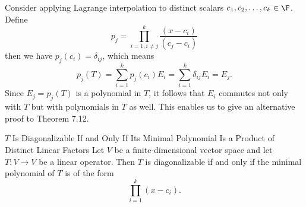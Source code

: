 \documentclass[linearalgebra]{subfiles}
\begin{document}
    \begin{remark}
        Consider applying Lagrange interpolation to distinct scalars $c_1, c_2, \ldots, c_k\in \F$. Define
        \begin{equation*}
            p_j = \prod^{k}_{i=1,i\neq j} \frac{(x-c_i)}{(c_j-c_i)}
        \end{equation*}
        then we have $p_j(c_i) = \delta_{ij}$, which means
        \begin{equation*}
            p_j(T) = \sum^{k}_{i=1} p_j(c_i)E_i = \sum^{k}_{i=1} \delta_{ij}E_i = E_j.
        \end{equation*}
        Since $E_j = p_j(T)$ is a polynomial in $T$, it follows that $E_i$ commutes not only with $T$ but with polynomials in $T$ as well. This enables us to give an alternative proof to Theorem 7.12.
    \end{remark}

    \setcounter{stcounter}{11}
    \begin{theorem}{$T$ Is Diagonalizable If and Only If Its Minimal Polynomial Is a Product of Distinct Linear Factors}
        Let $V$ be a finite-dimensional vector space and let $T:V\to V$ be a linear operator. Then $T$ is diagonalizable if and only if the minimal polynomial of $T$ is of the form
        \begin{equation*}
            \prod^{k}_{i=1} (x-c_i).
        \end{equation*}
    \end{theorem}
    \setcounter{stcounter}{17}
\end{document}
